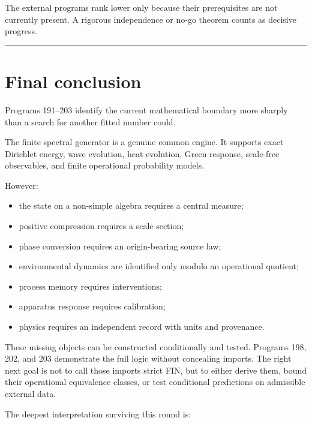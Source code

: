\documentclass[11pt,a4paper,openany]{report}
\begin{document}
The external programs rank lower only because their prerequisites are not currently present. A rigorous independence or no-go theorem counts as decisive progress.

\par\medskip\hrule\medskip

\chapter{Final conclusion}

Programs 191--203 identify the current mathematical boundary more sharply than a search for another fitted number could.

The finite spectral generator is a genuine common engine. It supports exact Dirichlet energy, wave evolution, heat evolution, Green response, scale-free observables, and finite operational probability models.

However:

\begin{itemize}
\item 
the state on a non-simple algebra requires a central measure;

\item 
positive compression requires a scale section;

\item 
phase conversion requires an origin-bearing source law;

\item 
environmental dynamics are identified only modulo an operational quotient;

\item 
process memory requires interventions;

\item 
apparatus response requires calibration;

\item 
physics requires an independent record with units and provenance.

\end{itemize}

These missing objects can be constructed conditionally and tested. Programs 198, 202, and 203 demonstrate the full logic without concealing imports. The right next goal is not to call those imports strict FIN, but to either derive them, bound their operational equivalence classes, or test conditional predictions on admissible external data.

The deepest interpretation surviving this round is:
\end{document}
